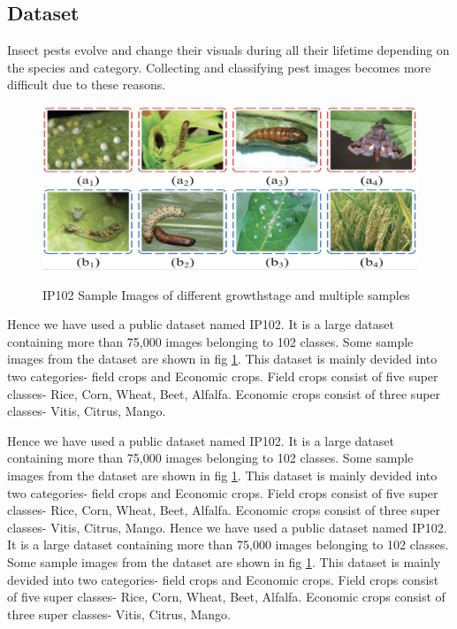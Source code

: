 \subsection{Dataset}
Insect pests evolve and change their visuals during all their lifetime depending on the species and category. Collecting and classifying pest images becomes more difficult due to these reasons.

\begin{center}
\begin{figure}[htb]
    \centering
    \includegraphics[scale=.7]{figures/ip102.png}\\
    \caption{IP102 Sample Images of different growthstage and multiple samples \cite{wu2019ip102}}
    \label{fig:ip102}
\end{figure}
\end{center}
Hence we have used a public dataset named IP102. It is a large dataset containing more than 75,000 images belonging to 102 classes. Some sample images from the dataset are shown in fig \ref{fig:ip102}. This dataset is mainly devided into two categories- field crops and Economic crops. Field crops consist of five super classes- Rice, Corn, Wheat, Beet, Alfalfa. Economic crops consist of three super classes- Vitis, Citrus, Mango.

\newpage
Hence we have used a public dataset named IP102. It is a large dataset containing more than 75,000 images belonging to 102 classes. Some sample images from the dataset are shown in fig \ref{fig:ip102}. This dataset is mainly devided into two categories- field crops and Economic crops. Field crops consist of five super classes- Rice, Corn, Wheat, Beet, Alfalfa. Economic crops consist of three super classes- Vitis, Citrus, Mango.
\newpage
Hence we have used a public dataset named IP102. It is a large dataset containing more than 75,000 images belonging to 102 classes. Some sample images from the dataset are shown in fig \ref{fig:ip102}. This dataset is mainly devided into two categories- field crops and Economic crops. Field crops consist of five super classes- Rice, Corn, Wheat, Beet, Alfalfa. Economic crops consist of three super classes- Vitis, Citrus, Mango.
\newpage

